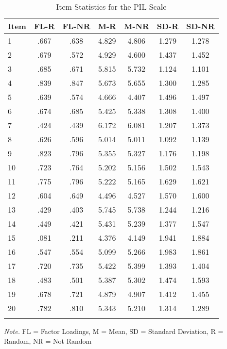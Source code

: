 \documentclass[english,man, mask]{apa6}
\theoremstyle{definition}
\theoremstyle{definition}
\theoremstyle{definition}
\theoremstyle{remark}
\begin{document}
\begin{table}[tbp]
\begin{center}
\begin{threeparttable}
\caption{\label{tab:Ptable}Item Statistics for the PIL Scale}
\begin{tabular}{lcccccc}
\toprule
Item & \multicolumn{1}{c}{FL-R} & \multicolumn{1}{c}{FL-NR} & \multicolumn{1}{c}{M-R} & \multicolumn{1}{c}{M-NR} & \multicolumn{1}{c}{SD-R} & \multicolumn{1}{c}{SD-NR}\\
\midrule
1 & .667 & .638 & 4.829 & 4.806 & 1.279 & 1.278\\
2 & .679 & .572 & 4.929 & 4.600 & 1.437 & 1.452\\
3 & .685 & .671 & 5.815 & 5.732 & 1.124 & 1.101\\
4 & .839 & .847 & 5.673 & 5.655 & 1.300 & 1.285\\
5 & .639 & .574 & 4.666 & 4.407 & 1.496 & 1.497\\
6 & .674 & .685 & 5.425 & 5.338 & 1.308 & 1.400\\
7 & .424 & .439 & 6.172 & 6.081 & 1.207 & 1.373\\
8 & .626 & .596 & 5.014 & 5.011 & 1.092 & 1.139\\
9 & .823 & .796 & 5.355 & 5.327 & 1.176 & 1.198\\
10 & .723 & .764 & 5.202 & 5.156 & 1.502 & 1.543\\
11 & .775 & .796 & 5.222 & 5.165 & 1.629 & 1.621\\
12 & .604 & .649 & 4.496 & 4.527 & 1.570 & 1.600\\
13 & .429 & .403 & 5.745 & 5.738 & 1.244 & 1.216\\
14 & .449 & .421 & 5.431 & 5.239 & 1.377 & 1.547\\
15 & .081 & .211 & 4.376 & 4.149 & 1.941 & 1.884\\
16 & .547 & .554 & 5.099 & 5.266 & 1.983 & 1.861\\
17 & .720 & .735 & 5.422 & 5.399 & 1.393 & 1.404\\
18 & .483 & .501 & 5.387 & 5.302 & 1.474 & 1.593\\
19 & .678 & .721 & 4.879 & 4.907 & 1.412 & 1.455\\
20 & .782 & .810 & 5.343 & 5.210 & 1.314 & 1.289\\
\bottomrule
\addlinespace
\end{tabular}
\begin{tablenotes}[para]
\textit{Note.} FL = Factor Loadings, M = Mean, SD = Standard Deviation, R = Random, NR = Not Random
\end{tablenotes}
\end{threeparttable}
\end{center}
\end{table}
\end{document}
